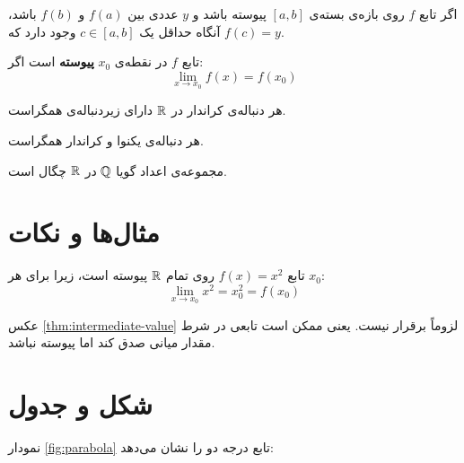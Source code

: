 \documentclass{matinbook}
\begin{document}
\begin{theorem}
    اگر تابع $f$ روی بازه‌ی بسته‌ی $[a, b]$ پیوسته باشد
    و $y$ عددی بین $f(a)$ و $f(b)$ باشد، آنگاه حداقل یک
    $c \in [a, b]$ وجود دارد که $f(c) = y$.
    \label{thm:intermediate-value}
\end{theorem}

\begin{definition}[پیوستگی]
    تابع $f$ در نقطه‌ی $x_{0}$ \textbf{پیوسته} است اگر:
    \[
        \lim_{x \to x_{0}} f(x) = f(x_{0})
    \]
    \label{def:continuity}
\end{definition}

\begin{lemma}[لم فشردگی]
    هر دنباله‌ی کراندار در $\mathbb{R}$ دارای زیردنباله‌ی همگراست.
    \label{lem:bolzano-weierstrass}
\end{lemma}

\begin{corollary}
    هر دنباله‌ی یکنوا و کراندار همگراست.
    \label{cor:monotone-convergence}
\end{corollary}

\begin{proposition}
    مجموعه‌ی اعداد گویا $\mathbb{Q}$ در $\mathbb{R}$ چگال است.
    \label{prop:q-dense}
\end{proposition}

\section{مثال‌ها و نکات}
\label{sec:targets-examples}

\begin{example}
    تابع $f(x) = x^{2}$ روی تمام $\mathbb{R}$ پیوسته است،
    زیرا برای هر $x_{0}$:
    \[
        \lim_{x \to x_{0}} x^{2} = x_{0}^{2} = f(x_{0})
    \]
    \label{ex:continuous-function}
\end{example}

\begin{remark}
    عکس \cref{thm:intermediate-value} لزوماً برقرار نیست.
    یعنی ممکن است تابعی در شرط مقدار میانی صدق کند اما
    پیوسته نباشد.
    \label{rem:ivt-converse}
\end{remark}

\section{شکل و جدول}
\label{sec:targets-figure-table}

نمودار \cref{fig:parabola} تابع درجه دو را نشان می‌دهد:
\end{document}
